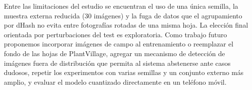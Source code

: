 Entre las limitaciones del estudio se encuentran el uso de una única semilla, la muestra
externa reducida (30 imágenes) y la fuga de datos que el agrupamiento por dHash no evita entre
fotografías rotadas de una misma hoja. La elección final orientada por perturbaciones
del test es exploratoria. Como trabajo futuro proponemos incorporar imágenes de
campo al entrenamiento o reemplazar el fondo de las hojas de PlantVillage, agregar un mecanismo
de detección de imágenes fuera de distribución que permita al sistema abstenerse ante casos
dudosos, repetir los experimentos con varias semillas y un conjunto externo más amplio, y
evaluar el modelo cuantizado directamente en un teléfono móvil.
